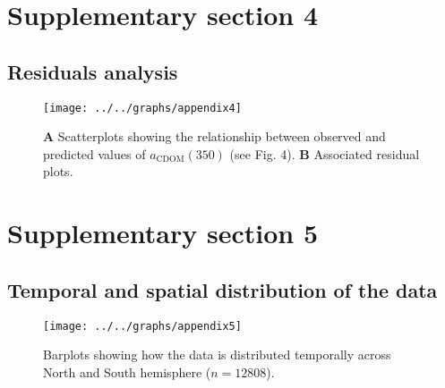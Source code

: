 \documentclass[12pt,a4paper]{scrartcl}
\begin{document}
\clearpage
\newpage

\section*{Supplementary section 4}
\subsection*{Residuals analysis}

\begin{figure}[H]
	\centering
	\texttt{[image: ../../graphs/appendix4]}
	\caption{\textbf{A} Scatterplots showing the relationship between observed and predicted values of $a_{\text{CDOM}}(350)$ (see Fig. 4). \textbf{B} Associated residual plots.}
\end{figure}

\clearpage
\newpage

\section*{Supplementary section 5}
\subsection*{Temporal and spatial distribution of the data}

\begin{figure}[h]
	\centering
	\texttt{[image: ../../graphs/appendix5]}
	\caption{Barplots showing how the data is distributed temporally across North and South hemisphere ($n = 12808$).}
\end{figure}
\end{document}
